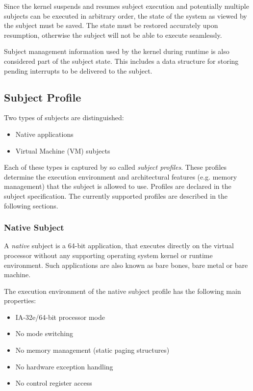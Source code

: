 Since the kernel suspends and resumes subject execution and potentially
multiple subjects can be executed in arbitrary order, the state of the system
as viewed by the subject must be saved. The state must be restored accurately
upon resumption, otherwise the subject will not be able to execute seamlessly.

Subject management information used by the kernel during runtime is also
considered part of the subject state. This includes a data
structure for storing pending interrupts to be delivered to the subject.

\subsection{Subject Profile}
Two types of subjects are distinguished:

\begin{itemize}
	\item Native applications
	\item Virtual Machine (VM) subjects
\end{itemize}

Each of these types is captured by so called \emph{subject
profiles}. These profiles determine the execution
environment and architectural features (e.g.  memory management) that the
subject is allowed to use. Profiles are declared in the subject specification.
The currently supported profiles are described in the following sections.

\subsubsection{Native Subject}
A \emph{native} subject is a 64-bit application, that
executes directly on the virtual processor without any supporting operating
system kernel or runtime environment. Such applications are also known as bare
bones, bare metal or bare machine.

The execution environment of the native subject profile has the following main
properties:

\begin{itemize}
	\item IA-32e/64-bit processor mode
	\item No mode switching
	\item No memory management (static paging structures)
	\item No hardware exception handling
	\item No control register access
\end{itemize}

